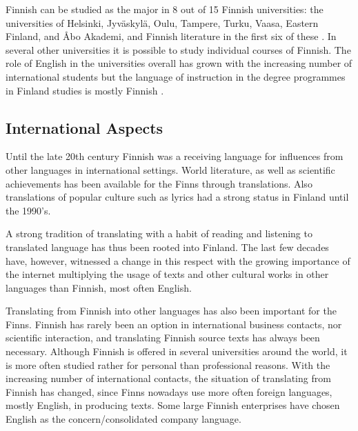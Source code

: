\begin{multicols}{2}
Finnish can be studied as the major in 8 out of 15 Finnish universities: the universities of Helsinki, Jyväskylä, Oulu, Tampere, Turku, Vaasa, Eastern Finland, and Åbo Akademi, and Finnish literature in the first six of these \cite{hum-ulko}. In several other universities it is possible to study individual courses of Finnish. The role of English in the universities overall has grown with the increasing number of international students but the language of instruction in the degree programmes in Finland studies is mostly Finnish \cite{Board}.

\subsection{International Aspects}

Until the late 20th century Finnish was a receiving language for influences from other languages in international settings. World literature, as well as scientific achievements has been available for the Finns through translations. Also translations of popular culture such as lyrics had a strong status in Finland until the 1990's.

A strong tradition of translating with a habit of reading and listening to translated language has thus been rooted into Finland.  The last few decades have, however, witnessed a change in this respect with the growing importance of the internet multiplying the usage of texts and other cultural works in other languages than Finnish, most often English.

Translating from Finnish into other languages has also been important for the Finns. Finnish has rarely been an option in international business contacts, nor scientific interaction, and translating Finnish source texts has always been necessary. Although Finnish is offered in several universities around the world, it is more often studied rather for personal than professional reasons.  With the increasing number of international contacts, the situation of translating from Finnish has changed, since Finns nowadays use more often foreign languages, mostly English, in producing texts. Some large Finnish enterprises have chosen English as the concern/consolidated company language.  



\end{multicols}
